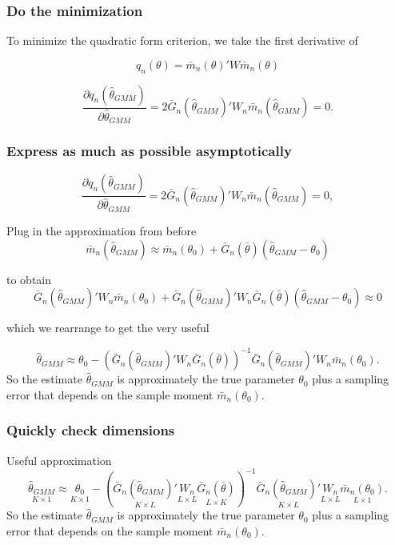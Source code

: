 \documentclass[a4paper,12pt]{article}
\begin{document}
\subsubsection*{Do the minimization}

To minimize the quadratic form criterion, we take the first derivative of

$$q_n(\theta)=\bar{m}_n(\theta)'W\bar{m}_n(\theta)$$


$$\frac{\partial q_n(\hat{\theta}_{GMM})}{\partial \hat{\theta}_{GMM}}= 2\bar{G}_n(\hat{\theta}_{GMM})'W_n\bar{m}_n(\hat{\theta}_{GMM})=0.$$




\subsubsection*{Express as much as possible asymptotically}

$$\frac{\partial q_n(\hat{\theta}_{GMM})}{\partial \hat{\theta}_{GMM}}= 2\bar{G}_n(\hat{\theta}_{GMM})'W_n\bar{m}_n(\hat{\theta}_{GMM})=0,$$

Plug in the approximation from before
$$\bar{m}_n(\hat{\theta}_{GMM})\approx \bar{m}_n(\theta_0)+\bar{G}_n(\bar{\theta})(\hat{\theta}_{GMM}-\theta_0)$$

to obtain
$$\bar{G}_n(\hat{\theta}_{GMM})'W_n\bar{m}_n(\theta_0)+\bar{G}_n(\hat{\theta}_{GMM})'W_n\bar{G}_n(\bar{\theta})(\hat{\theta}_{GMM}-\theta_0)\approx0$$



which we rearrange to get the very useful

$$\hat{\theta}_{GMM}\approx \theta_0-(\bar{G}_n(\hat{\theta}_{GMM})'W_n\bar{G}_n(\bar{\theta}))^{-1}\bar{G}_n(\hat{\theta}_{GMM})'W_n\bar{m}_n(\theta_0).$$
So the estimate $\hat{\theta}_{GMM}$ is approximately the true parameter $\theta_0$ plus a sampling error that depends on the sample moment $\bar{m}_n(\theta_0)$.




\subsubsection*{Quickly check dimensions}

Useful approximation
$$\underset{\scriptscriptstyle K\times1}{\hat{\theta}_{GMM}}\approx \underset{\scriptscriptstyle K\times1}{\theta_0}-(\underset{\scriptscriptstyle K\times L}{\bar{G}_n(\hat{\theta}_{GMM})'}\underset{\scriptscriptstyle L\times L}{W_n}\underset{\scriptscriptstyle L\times K}{\bar{G}_n(\bar{\theta})})^{-1}\underset{\scriptscriptstyle K\times L}{\bar{G}_n(\hat{\theta}_{GMM})'}\underset{\scriptscriptstyle L\times L}{W_n}\underset{\scriptscriptstyle L\times1}{\bar{m}_n(\theta_0)}.$$
So the estimate $\hat{\theta}_{GMM}$ is approximately the true parameter $\theta_0$ plus a sampling error that depends on the sample moment $\bar{m}_n(\theta_0)$.
\end{document}
